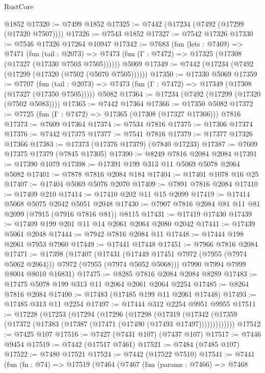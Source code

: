 \begin{lexlean}{RustCore}
\begin{coremodule}
    @1852
@17320 := @7499 @1852
@17325 := @7442 (@17234 (@7492 (@17299 (@17320 @7507))))
@17326 := @7543 @1852
@17327 := @7542 @17326
@17330 := @7546 @17326 @17264 @10947
@17342 := @7683
    (fun (lets : @7469) =>
    @7471
      (fun (tail : @2073) =>
      @7473 (fun (Γ : @7472) => @17325 (@17308 (@17327 (@17330 @7503 @7505))))))
    @5069
@17349 := @7442 (@17234 (@7492 (@17299 (@17320 (@7502 (@5070 @7505))))))
@17350 := @17330 @5069
@17359 := @7707
    (fun (tail : @2073) => @7473 (fun (Γ : @7472) => @17349 (@17308 (@17327 (@17350 @7505)))))
    @5082
@17364 := @17234 (@7492 (@17299 (@17320 (@7502 @5083))))
@17365 := @7442 @17364
@17366 := @17350 @5082
@17372 := @7725 (fun (Γ : @7472) => @17365 (@17308 (@17327 @17366))) @7816
@17373 := @7609 @17364
@17374 := @7534 @7816
@17375 := @17306 @17374
@17376 := @7442 @17375
@17377 := @7541 @7816
@17379 := @17377 @17326 @17366
@17383 := @17373 (@17376 @17379) (@7840 @17233)
@17387 := @7609 @17375 @17379 (@7845 @17305)
@17390 := @8249 @7816 @2084 @2084
@17391 := @17390 @1079
@17398 := @17391 @199 @313 @11 @5069 @5078 @2064 @5082
@17401 := @7878 @7816 @2084 @184
@17404 := @17401 @1078 @16 @25
@17407 := @17404 @5069 @5076 @2070
@17409 := @7891 @7816 @2084
@17410 := @17409 @210
@17414 := @17410 @202 @11 @15 @2099
@17419 := @17414 @5068 @5075 @2042 @5051 @2048
@17430 := @7907 @7816 @2084 @81 @11 @81 @2099 (@7915 (@7916 @7816 @81)) @8115
@17431 := @17419 @17430
@17439 := @17409 @199 @201 @11 @14 @2061 @2064 @2080 @2042
@17441 := @17439 @5061 @2048
@17444 := @7942 @7816 @2084 @11
@17448 := @17444 @198 @2061 @7953 @7960
@17449 := @17441 @17448
@17451 := @7966 @7816 @2084
@17471 := @17398
    (@17407
      (@17431 (@17449 @17451 @7972 (@7955 (@7974 @5062 @2064))) @7972 (@7955 (@7974 @5052 @5068)))
      @7990
      @7994
      @7999
      @8004
      @8010
      @16831)
@17475 := @8285 @7816 @2084 @2084 @8289
@17483 := @17475 @5078 @199 @313 @11 @2064 @2061 @2064 @2254
@17485 := @8264 @7816 @2084
@17490 := @17483 (@17485 @199 @11 @2061 @17448)
@17493 := @17485 @313 @11 @2254
@17497 := @17444 @312 @2254 @9951 @9955
@17511 := @17228
    (@17253
      (@17294
        (@17296
          (@17298
            (@17319
              (@17342 (@17359 (@17372 (@17383 (@17387 (@17471 (@17490 (@17493 @17497)))))))))))))
@17512 := @7425 @107
@17516 := @7427 (@7431 @107) (@7437 @107)
@17517 := @7446 @9454
@17519 := @7442 (@17517 @7461)
@17521 := @7484 (@7485 @107)
@17522 := @7480 @17521
@17524 := @7442 (@17522 @7510)
@17541 := @7441
    (fun (fn : @74) =>
    @17519
      (@7464
        (@7467
          (fun (params : @7466) =>
          @7468

\end{coremodule}
\end{lexlean}
